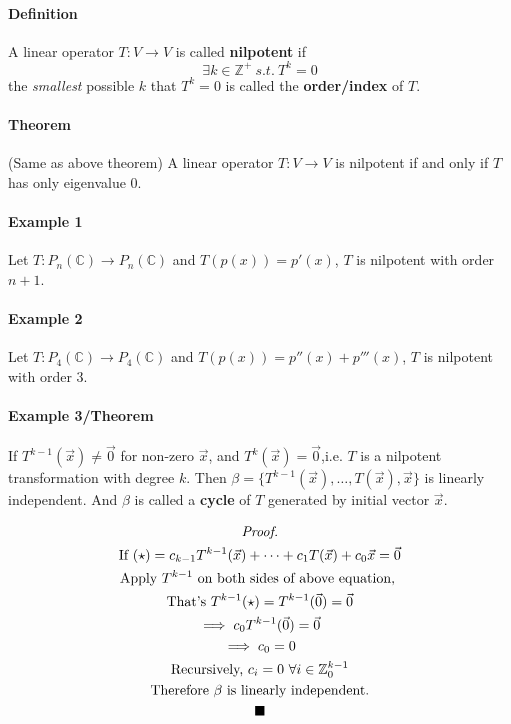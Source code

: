 \documentclass[11pt]{article}
\newcommand{\trans}[3]{{#1}: {#2} \to {#3}}
\newcommand{\definition}[0]{\paragraph{Definition}}
\newcommand{\theorem}[0]{\paragraph{Theorem}}
\newcommand{\C}[0]{\mathbb{C}}
\newcommand{\tx}[1]{\text{{#1}}}
\begin{document}
	\definition A linear operator $\trans{T}{V}{V}$ is called \textbf{nilpotent} if 
	\[
		\exists k \in \mathbb{Z}^+\ s.t.\ T^k = 0
	\] the \emph{smallest} possible $k$ that $T^k = 0$ is called the \textbf{order/index} of $T$.
	
	\theorem(Same as above theorem) A linear operator $\trans{T}{V}{V}$ is nilpotent if and only if $T$ has only eigenvalue $0$.
	
	\paragraph{Example 1} Let $\trans{T}{P_n(\C)}{P_n(\C)}$ and $T(p(x)) = p'(x)$, $T$ is nilpotent with order $n+1$.
	
	\paragraph{Example 2} Let $\trans{T}{P_4(\C)}{P_4(\C)}$ and $T(p(x)) = p''(x) + p'''(x)$, $T$ is nilpotent with order $3$.
	
	\paragraph{Example 3/Theorem} If $T^{k-1}(\vec{x}) \neq \vec{0}$ for non-zero $\vec{x}$, and $T^k(\vec{x}) = \vec{0}$,i.e. $T$ is a nilpotent transformation with degree $k$. Then $\beta = \{T^{k-1}(\vec{x}), \dots, T(\vec{x}), \vec{x}\}$ is linearly independent. And $\beta$ is called a \textbf{cycle} of $T$ generated by initial vector $\vec{x}$.
	
	\begin{multline*}
		\emph{Proof.} \\
		\tx{If } (\star) = c_{k-1}T^{k-1}(\vec{x}) + \dots + c_1T(\vec{x}) + c_0\vec{x} = \vec{0} \\
		\tx{Apply $T^{k-1}$ on both sides of above equation, } \\
		\tx{That's } T^{k-1}(\star) = T^{k-1}(\vec{0}) = \vec{0} \\
		\implies c_0 T^{k-1}(\vec{0}) = \vec{0} \\
		\implies c_0 = 0 \\
		\tx{Recursively, } c_i = 0\ \forall i \in \mathbb{Z}_0^{k-1} \\
		\tx{Therefore $\beta$ is linearly independent.} \\ 
 		\blacksquare
	\end{multline*}
	
\end{document}
